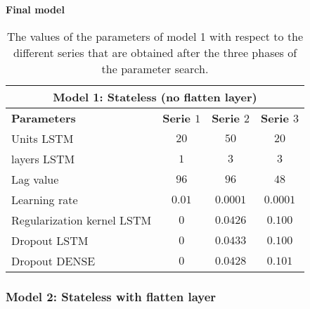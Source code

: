 \textbf{Final model}\\

\begin{table}[ht]
	\centering
	\begin{tabular}{@{}l|ccc@{}} \toprule
		\multicolumn{4}{c}{Model 1: Stateless (no flatten layer)}\\\midrule\midrule
		\textbf{Parameters}	& \textbf{Serie $ 1 $} & \textbf{Serie $ 2 $} & \textbf{Serie $ 3 $}\\\midrule
		Units LSTM & $20 $&$ 50 $  & $20 $\\
		layers LSTM & $1 $&$ 3 $  & $3$\\
		Lag value & $96 $&$ 96$  & $48$\\
		Learning rate & $0.01 $&$ 0.0001$  & $0.0001$\\\hline
		Regularization kernel LSTM   & $ 0 $ & $ 0.0426 $ & $ 0.100 $\\
		Dropout LSTM   & $ 0 $ & $ 0.0433 $ & $ 0.100 $\\
		Dropout DENSE   & $ 0 $ & $ 0.0428 $ & $ 0.101 $\\\bottomrule
	\end{tabular}
	\caption{The values of the parameters of model 1 with respect to the different series that are obtained after the three phases of the parameter search.}
	\label{tab:best_performing_para_final}
\end{table}


\subsubsection{Model 2: Stateless with flatten layer}

